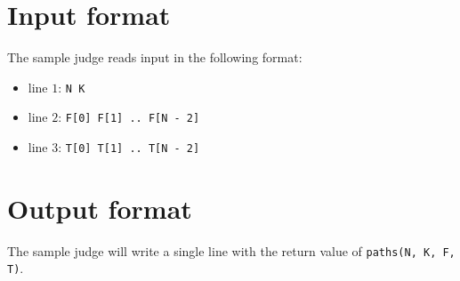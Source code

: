 \section*{Input format}
The sample judge reads input in the following format:

\begin{itemize}
  \item line $1$: \texttt{N K}
  \item line $2$: \texttt{F[0] F[1] .. F[N - 2]}
  \item line $3$: \texttt{T[0] T[1] .. T[N - 2]}
\end{itemize}

\section*{Output format}
The sample judge will write a single line with the return value of \texttt{paths(N, K, F, T)}.
